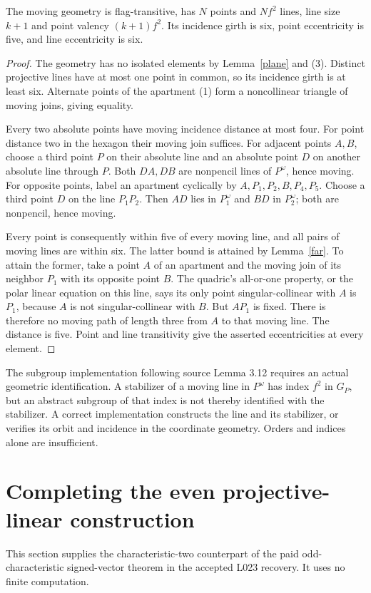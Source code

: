 \documentclass[11pt,a4paper]{article}
\begin{document}
\begin{theorem}\label{classical}
The moving geometry is flag-transitive, has $N$ points and $Nf^2$ lines,
line size $k+1$ and point valency $(k+1)f^2$. Its incidence girth is six,
point eccentricity is five, and line eccentricity is six.
\end{theorem}
\begin{proof}
The geometry has no isolated elements by Lemma~\ref{plane} and (3).
Distinct projective lines have at most one point in common, so its incidence
girth is at least six. Alternate points of the apartment (1) form a
noncollinear triangle of moving joins, giving equality.

Every two absolute points have moving incidence distance at most four.
For point distance two in the hexagon their moving join suffices.
For adjacent points $A,B$, choose a third point $P$ on their absolute line
and an absolute point $D$ on another absolute line through $P$.
Both $DA,DB$ are nonpencil lines of $P^\omega$, hence moving.
For opposite points, label an apartment cyclically by $A,P_1,P_2,B,P_4,P_5$.
Choose a third point $D$ on the line $P_1P_2$. Then $AD$ lies in
$P_1^\omega$ and $BD$ in $P_2^\omega$; both are nonpencil, hence moving.

Every point is consequently within five of every moving line, and all pairs
of moving lines are within six. The latter bound is attained by
Lemma~\ref{far}. To attain the former, take a point $A$ of an apartment
and the moving join of its neighbor $P_1$ with its opposite point $B$.
The quadric's all-or-one property, or the polar linear equation on this
line, says its only point singular-collinear with $A$ is $P_1$, because
$A$ is not singular-collinear with $B$. But $AP_1$ is fixed. There is
therefore no moving path of length three from $A$ to that moving line.
The distance is five. Point and line transitivity give the asserted
eccentricities at every element.
\end{proof}

The subgroup implementation following source Lemma 3.12 requires an actual
geometric identification. A stabilizer of a moving line in $P^\omega$ has
index $f^2$ in $G_P$, but an abstract subgroup of that index is not thereby
identified with the stabilizer. A correct implementation constructs the
line and its stabilizer, or verifies its orbit and incidence in the
coordinate geometry. Orders and indices alone are insufficient.

\section{Completing the even projective-linear construction}
This section supplies the characteristic-two counterpart of the paid
odd-characteristic signed-vector theorem in the accepted L023 recovery.
It uses no finite computation.
\end{document}
